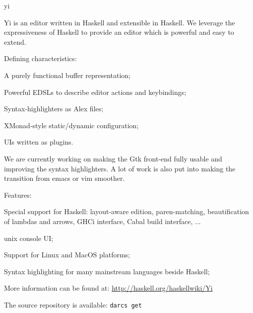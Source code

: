 \begin{hcarentry}[section]{yi}
\label{yi}
\makeheader

Yi is an editor written in Haskell and extensible in Haskell. We leverage the
expressiveness of Haskell to provide an editor which is powerful and easy to
extend.

Defining characteristics:
\begin{compactitem}
\item A purely functional buffer representation;
\item Powerful EDSLs to describe editor actions and keybindings;
\item Syntax-highlighters as Alex files;
\item XMonad-style static/dynamic configuration;
\item UIs written as plugins.
\end{compactitem}

We are currently working on making the Gtk front-end fully usable and improving
the syntax highlighters. A lot of work is also put into making the transition
from emacs or vim smoother.

Features:
\begin{compactitem}
\item Special support for Haskell: layout-aware edition, paren-matching, beautification of lambdas and arrows, GHCi interface, Cabal build interface, ...
\item unix console UI;
\item Support for Linux and MacOS platforms;
\item Syntax highlighting for many mainstream languages beside Haskell;
\end{compactitem}


\FurtherReading
\begin{compactitem}
\item More information can be found at:
 \url{http://haskell.org/haskellwiki/Yi}

\item The source repository is available:
 \texttt{darcs get}
\end{compactitem}
\end{hcarentry}
